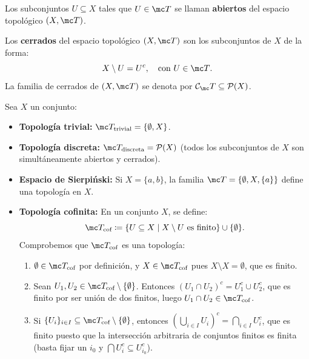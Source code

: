 \begin{defi}
Los subconjuntos \(U \subseteq X\) tales que \(U \in \mc T\) se llaman \textbf{abiertos} del espacio topológico \((X, \mc T)\).
\end{defi}

\begin{defi}
Los \textbf{cerrados} del espacio topológico \((X, \mc T)\) son los subconjuntos de \(X\) de la forma:
\[
    X \setminus U = U^c, \quad \text{con } U \in \mc T \text{}.
\]
La familia de cerrados de \((X, \mc T)\) se denota por \(\mathcal{C}_\mc T \subseteq \mathcal{P}(X)\).
\end{defi}

\begin{ejem}
Sea \(X\) un conjunto:
\begin{itemize}
    \item \textbf{Topología trivial:} \(\mc T_{\text{trivial}} = \{\emptyset, X\}\).
    \item \textbf{Topología discreta:} \(\mc T_{\text{discreta}} = \mathcal{P}(X)\) (todos los subconjuntos de \(X\) son simultáneamente abiertos y cerrados).
    \item \textbf{Espacio de Sierpiński:} Si \(X = \{a, b\}\), la familia \(\mc T = \{\emptyset, X, \{a\}\}\) define una topología en \(X\).
    \item \textbf{Topología cofinita:} En un conjunto \(X\), se define:
    \[
        \mc T_{\text{cof}} \coloneqq \{U \subseteq X \mid X \setminus U \text{ es finito}\} \cup \{\emptyset\} \text{}.
    \]
    Comprobemos que \(\mc T_{\text{cof}}\) es una topología:
    \begin{enumerate}
        \item[\textbf{1)}] \(\emptyset \in \mc T_{\text{cof}}\) por definición, y \(X \in \mc T_{\text{cof}}\) pues \(X \setminus X = \emptyset\), que es finito.
        \item[\textbf{2)}] Sean \(U_1, U_2 \in \mc T_{\text{cof}} \setminus \{\emptyset\}\). Entonces \((U_1 \cap U_2)^c = U_1^c \cup U_2^c\), que es finito por ser unión de dos finitos, luego \(U_1 \cap U_2 \in \mc T_{\text{cof}}\).
        \item[\textbf{3)}] Si \(\{U_i\}_{i \in I} \subseteq \mc T_{\text{cof}} \setminus \{\emptyset\}\), entonces \(\left(\bigcup_{i \in I} U_i\right)^c = \bigcap_{i \in I} U_i^c\), que es finito puesto que la intersección arbitraria de conjuntos finitos es finita (basta fijar un \(i_0\) y \(\bigcap U_i^c \subseteq U_{i_0}^c\)).
    \end{enumerate}

\end{itemize}
\end{ejem}
